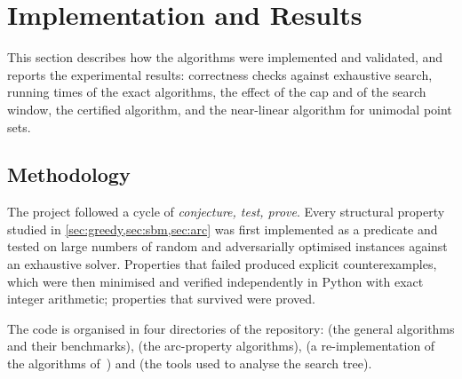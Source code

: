 \chapter{Implementation and Results}\label{ch:results}

\begin{chapterabstract}
This section describes how the algorithms were implemented and validated,
and reports the experimental results: correctness checks against exhaustive
search, running times of the exact algorithms, the effect of the cap and of the
search window, the certified algorithm, and the near-linear algorithm for
unimodal point sets.
\end{chapterabstract}

\section*{Methodology}

The project followed a cycle of \emph{conjecture, test, prove}. Every structural
property studied in \cref{sec:greedy,sec:sbm,sec:arc} was first implemented as a
predicate and tested on large numbers of random and adversarially optimised
instances against an exhaustive solver. Properties that failed produced
explicit counterexamples, which were then minimised and verified independently
in Python with exact integer arithmetic; properties that survived were proved.

The code is organised in four directories of the repository:
 (the general algorithms and their benchmarks), 
(the arc-property algorithms),  (a re-implementation of the
algorithms of~\citet{sbm}) and  (the tools used to analyse the
search tree).


